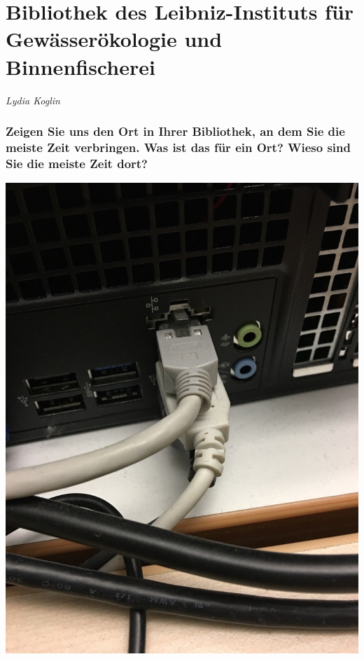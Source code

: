 
\vspace*{.5cm}
\section{Bibliothek des Leibniz-Instituts für Gewässerökologie und Binnenfischerei}
\begin{center}
\emph{Lydia Koglin}
\end{center}
\vspace*{1cm}

\hypertarget{zeigen-sie-uns-den-ort-in-ihrer-bibliothek-an-dem-sie-die-meiste-zeit-verbringen.-was-ist-das-fuxfcr-ein-ort-wieso-sind-sie-die-meiste-zeit-dort}{%
\subsubsection*{Zeigen Sie uns den Ort in Ihrer Bibliothek, an dem Sie die
meiste Zeit verbringen. Was ist das für ein Ort? Wieso sind Sie die
meiste Zeit
dort?}\label{zeigen-sie-uns-den-ort-in-ihrer-bibliothek-an-dem-sie-die-meiste-zeit-verbringen.-was-ist-das-fuxfcr-ein-ort-wieso-sind-sie-die-meiste-zeit-dort}}

\begin{center}
\includegraphics{igb/img/internet.jpg}
\end{center}

